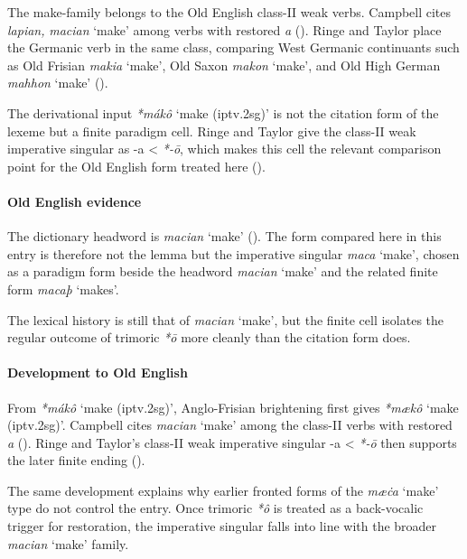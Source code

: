 \documentclass[
  british,
  a4paper,
]{article}
\providecommand{\Recon}[1]{\emph{*#1}}
\begin{document}
The make-family belongs to the Old English class-II weak verbs. Campbell
cites \emph{lapian,} {\emph{macian}} `make' among verbs with restored
\emph{a} (). Ringe
and Taylor place the Germanic verb in the same class, comparing West
Germanic continuants such as Old Frisian {\emph{makia}} `make', Old
Saxon {\emph{makon}} `make', and Old High German {\emph{mahhon}} `make'
().

The derivational input \Recon{mákô} `make (iptv.2sg)' is not the
citation form of the lexeme but a finite paradigm cell. Ringe and Taylor
give the class-II weak imperative singular as -a \textless{} \emph{*-ō},
which makes this cell the relevant comparison point for the Old English
form treated here ().

\paragraph{Old English evidence}\label{old-english-evidence-134}

The dictionary headword is {\emph{macian}} `make'
(). The form compared
here in this entry is therefore not the lemma but the imperative
singular {\emph{maca}} `make', chosen as a paradigm form beside the
headword {\emph{macian}} `make' and the related finite form
{\emph{macaþ}} `makes'.

The lexical history is still that of \emph{macian} `make', but the
finite cell isolates the regular outcome of trimoric \emph{*ō} more
cleanly than the citation form does.

\paragraph{Development to Old
English}\label{development-to-old-english-134}

From \Recon{mákô} `make (iptv.2sg)', Anglo-Frisian brightening first
gives \Recon{mækô} `make (iptv.2sg)'. Campbell cites \emph{macian}
`make' among the class-II verbs with restored \emph{a}
(). Ringe and
Taylor's class-II weak imperative singular -a \textless{} \emph{*-ō}
then supports the later finite ending
().

The same development explains why earlier fronted forms of the
\emph{mæċa} `make' type do not control the entry. Once trimoric
\emph{*ô} is treated as a back-vocalic trigger for restoration, the
imperative singular falls into line with the broader \emph{macian}
`make' family.
\end{document}
